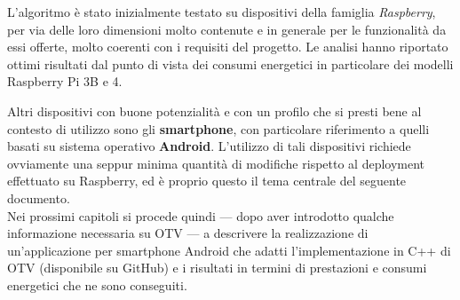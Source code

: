 L'algoritmo è stato inizialmente testato su dispositivi della famiglia \textit{Raspberry}, per via delle loro dimensioni molto
contenute e in generale per le funzionalità da essi offerte, molto coerenti con i requisiti del progetto. Le analisi hanno
riportato ottimi risultati dal punto di vista dei consumi energetici in particolare dei modelli Raspberry Pi 3B e 4.\cite{app11157027} 

Altri dispositivi con buone potenzialità e con un profilo che si presti bene al contesto di utilizzo sono gli \textbf{smartphone},
con particolare riferimento a quelli basati su sistema operativo \textbf{Android}. L'utilizzo di tali dispositivi richiede ovviamente
una seppur minima quantità di modifiche rispetto al deployment effettuato su Raspberry, ed è proprio questo il tema centrale
del seguente documento.\\
Nei prossimi capitoli si procede quindi --- dopo aver introdotto qualche informazione necessaria su OTV --- a descrivere 
la realizzazione di un'applicazione per smartphone Android che adatti l'implementazione in C++ di OTV (disponibile su GitHub)
e i risultati in termini di prestazioni e consumi energetici che ne sono conseguiti.




\clearpage{\pagestyle{empty}\cleardoublepage}